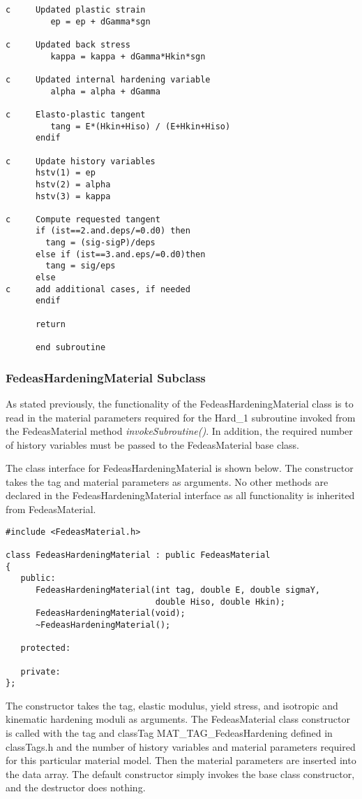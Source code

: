 \documentclass[12pt]{article}
\begin{document}
{\begin{verbatim}
c     Updated plastic strain
         ep = ep + dGamma*sgn

c     Updated back stress
         kappa = kappa + dGamma*Hkin*sgn
	
c     Updated internal hardening variable
         alpha = alpha + dGamma

c     Elasto-plastic tangent
         tang = E*(Hkin+Hiso) / (E+Hkin+Hiso)
      endif

c     Update history variables
      hstv(1) = ep
      hstv(2) = alpha
      hstv(3) = kappa

c     Compute requested tangent
      if (ist==2.and.deps/=0.d0) then
      	tang = (sig-sigP)/deps
      else if (ist==3.and.eps/=0.d0)then
      	tang = sig/eps
      else
c     add additional cases, if needed
      endif	         

      return

      end subroutine 
\end{verbatim}
}

\subsubsection{FedeasHardeningMaterial Subclass}
As stated previously, the functionality of the FedeasHardeningMaterial class is to read
in the material parameters required for the Hard\_1 subroutine invoked from the
FedeasMaterial method {\em invokeSubroutine()}. In addition, the required number of
history variables must be passed to the FedeasMaterial base class.

The class interface for FedeasHardeningMaterial is shown below.
The constructor takes the tag and material parameters as arguments. No other methods
are declared in the FedeasHardeningMaterial interface as all functionality
is inherited from FedeasMaterial.

{\sf\small
\begin{verbatim}
#include <FedeasMaterial.h>

class FedeasHardeningMaterial : public FedeasMaterial
{
   public:
      FedeasHardeningMaterial(int tag, double E, double sigmaY,
                              double Hiso, double Hkin);
      FedeasHardeningMaterial(void);
      ~FedeasHardeningMaterial();

   protected:

   private:
};
\end{verbatim}
}

\noindent The constructor takes the tag, elastic modulus, yield stress, and isotropic and
kinematic hardening moduli as arguments. The FedeasMaterial class constructor is
called with the tag and classTag MAT\_TAG\_FedeasHardening defined in classTags.h
and the number of history variables and material parameters required for this
particular material model. Then the material parameters are inserted into the data array.
The default constructor simply invokes the base class constructor, and the destructor
does nothing.
\end{document}
